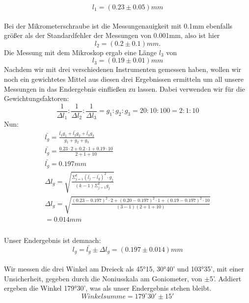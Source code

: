 \documentclass{article}
\begin{document}
\begin{equation}
l_1=(0.23\pm0.05)mm
\end{equation}
\\
Bei der Mikrometerschraube ist die Messungenauigkeit mit 0.1mm ebenfalls größer als der Standardfehler der Messungen von 0.001mm, also ist hier \\ 
\begin{equation}
l_2=(0.2\pm0.1)mm. 
\end{equation}
Die Messung mit dem Mikroskop ergab eine Länge $l_3$ von
\begin{equation}
l_3=(0.19 \pm 0.01) mm
\end{equation}
Nachdem wir mit drei verschiedenen Instrumenten gemessen haben, wollen wir noch ein gewichtetes Mittel aus diesen drei Ergebnissen ermitteln um all unsere Messungen in das Endergebnis einfließen zu lassen. Dabei verwenden wir für die Gewichtungsfaktoren:
\begin{equation}
\frac{1}{\Delta l_1}:\frac{1}{\Delta l_2}:\frac{1}{\Delta l_3}=g_1:g_2:g_3=20:10:100=2:1:10
\end{equation}
Nun:
\begin{gather*}
\bar{l_g}=\frac{\bar{l_1}g_1+\bar{l_2}g_2+\bar{l_3}g_3}{g_1+g_2+g_3} \\
\bar{l_g}=\frac{0.23\cdot2+0.2\cdot1+0.19\cdot10}{2+1+10} \\
\bar{l_g}=0.197mm \\
\Delta l_g= \sqrt{\frac{\Sigma^k_{j=1}( \bar{l_j} -\bar{l_g} )^2 \cdot g_j}{(k-1)\Sigma^k_{j=1}g_j} } \\
\Delta l_g= \sqrt{\frac{(0.23-0.197)^2\cdot2+(0.20-0.197)^2\cdot1+(0.19-0.197)^2\cdot10}{(3-1)(2+1+10)}}\\ = 0.014mm \\
\end{gather*}\\
Unser Endergebnis ist demnach:\\
\begin{equation}
l_g=\bar{l_g}\pm\Delta l_g = (0.197\pm0.014)mm
\end{equation}\\

Wir messen die drei Winkel am Dreieck als 45°15, 30°40' und 103°35', mit einer Unsicherheit, gegeben durch die Noniusskala am Goniometer, von $\pm$5'. Addiert ergeben die Winkel 179°30', was als unser Endergebnis stehen bleibt.
\begin{equation}
Winkelsumme=179^{\circ}30'\pm15'
\end{equation}
\end{document}
